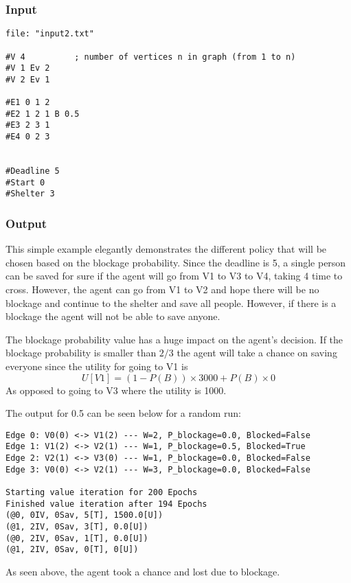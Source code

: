 \documentclass{article}                     %
\begin{document}
\subsubsection{Input}
\begin{verbatim}
file: "input2.txt"

#V 4          ; number of vertices n in graph (from 1 to n)
#V 1 Ev 2
#V 2 Ev 1

#E1 0 1 2 
#E2 1 2 1 B 0.5
#E3 2 3 1 
#E4 0 2 3


#Deadline 5
#Start 0
#Shelter 3
\end{verbatim}

\subsubsection{Output}
This simple example elegantly demonstrates the different policy that will be chosen based on the blockage probability. Since the deadline is 5, a single person can be saved for sure if the agent will go from V1 to V3 to V4, taking 4 time to cross. However, the agent can go from V1 to V2 and hope there will be no blockage and continue to the shelter and save all people. However, if there is a blockage the agent will not be able to save anyone.

The blockage probability value has a huge impact on the agent's decision. If the blockage probability  is smaller than $ 2/3 $ the agent will take a chance on saving everyone since the utility for going to V1 is
$$ U[V1] = (1 - P(B))\times 3000 + P(B) \times 0 $$
As opposed to going to V3 where the utility is 1000.

The output for 0.5 can be seen below for a random run:
\begin{verbatim}
Edge 0: V0(0) <-> V1(2) --- W=2, P_blockage=0.0, Blocked=False
Edge 1: V1(2) <-> V2(1) --- W=1, P_blockage=0.5, Blocked=True
Edge 2: V2(1) <-> V3(0) --- W=1, P_blockage=0.0, Blocked=False
Edge 3: V0(0) <-> V2(1) --- W=3, P_blockage=0.0, Blocked=False

Starting value iteration for 200 Epochs
Finished value iteration after 194 Epochs
(@0, 0IV, 0Sav, 5[T], 1500.0[U])
(@1, 2IV, 0Sav, 3[T], 0.0[U])
(@0, 2IV, 0Sav, 1[T], 0.0[U])
(@1, 2IV, 0Sav, 0[T], 0[U])
\end{verbatim}
As seen above, the agent took a chance and lost due to blockage.
\end{document}
